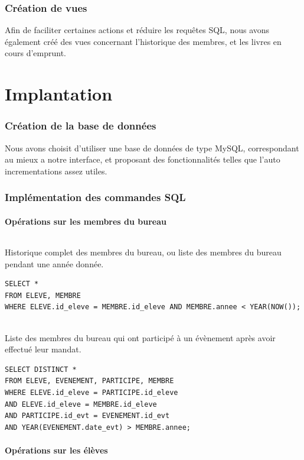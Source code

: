 \documentclass[a4paper, 11pt]{article}
\begin{document}
\section{Création de vues}
Afin de faciliter certaines actions et réduire les requêtes SQL, nous avons également créé des vues concernant l'historique des membres, et les livres en cours d'emprunt.

\newpage
\part{Implantation}
\setcounter{section}{0}
\section{Création de la base de données}
Nous avons choisit d'utiliser une base de données de type MySQL, correspondant au mieux a notre interface, et proposant des fonctionnalités telles que l'auto incrementations assez utiles.
\section{Implémentation des commandes SQL}
\subsection{Opérations sur les membres du bureau}
\paragraph{}
Historique complet des membres du bureau, ou liste des membres du bureau pendant une année donnée.
\begin{verbatim}
SELECT *
FROM ELEVE, MEMBRE
WHERE ELEVE.id_eleve = MEMBRE.id_eleve AND MEMBRE.annee < YEAR(NOW());
\end{verbatim}
\paragraph{}
Liste des membres du bureau qui ont participé à un évènement après avoir effectué leur mandat.
\begin{verbatim}
SELECT DISTINCT *
FROM ELEVE, EVENEMENT, PARTICIPE, MEMBRE
WHERE ELEVE.id_eleve = PARTICIPE.id_eleve
AND ELEVE.id_eleve = MEMBRE.id_eleve
AND PARTICIPE.id_evt = EVENEMENT.id_evt
AND YEAR(EVENEMENT.date_evt) > MEMBRE.annee;
\end{verbatim}
\subsection{Opérations sur les élèves}
\end{document}
